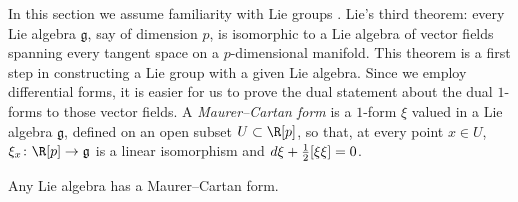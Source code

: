 %
In this section we assume familiarity with Lie groups \cite{Stillwell:2008}.
Lie's third theorem: every Lie algebra \(\mathfrak{g}\), say of dimension \(p\), is isomorphic to a Lie algebra of vector fields spanning every tangent space on a \(p\)-dimensional manifold.
This theorem is a first step in constructing a Lie group with a given Lie algebra.
Since we employ differential forms, it is easier for us to prove the dual statement about the dual \(1\)-forms to those vector fields.
A \emph{Maurer--Cartan form} is a \(1\)-form \(\xi\) valued in a Lie algebra \(\mathfrak{g}\), defined on an open subset \(U\subset\R[p]\), so that, at every point \(x\in U\), \(\xi_x \colon \R[p] \to \mathfrak{g}\) is a linear isomorphism and \(d\xi+\frac{1}{2}\lb{\xi}{\xi}=0\).
\begin{theorem}
Any Lie algebra has a Maurer--Cartan form.
\end{theorem}
